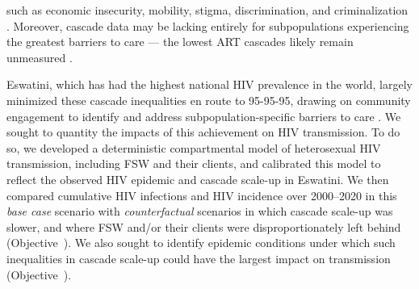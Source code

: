 such as economic insecurity, mobility, stigma, discrimination, and criminalization
\cite{Lancaster2016sr,Wanyenze2016,Schwartz2017,Schmidt-Sane2022}.
Moreover, cascade data may be lacking entirely
for subpopulations experiencing the greatest barriers to care
--- \ie the lowest ART cascades likely remain unmeasured \cite{Hakim2018}.
\par
Eswatini, which has had the highest national HIV prevalence in the world,
largely minimized these cascade inequalities en route to 95-95-95,
drawing on community engagement to identify and address
subpopulation-specific barriers to care \cite{Walsh2020,SHIMS3,EswIBBS2022}.
We sought to quantity the impacts of this achievement on HIV transmission.
To do so, we developed a deterministic compartmental model
of heterosexual HIV transmission, including FSW and their clients,
and calibrated this model to reflect
the observed HIV epidemic and cascade scale-up in Eswatini.
We then compared cumulative HIV infections and HIV incidence over 2000--2020
in this \emph{base case} scenario
with \emph{counterfactual} scenarios
in which cascade scale-up was slower,
and where FSW and/or their clients were disproportionately left behind
(Objective~).
We also sought to identify epidemic conditions under which
such inequalities in cascade scale-up
could have the largest impact on transmission
(Objective~).
